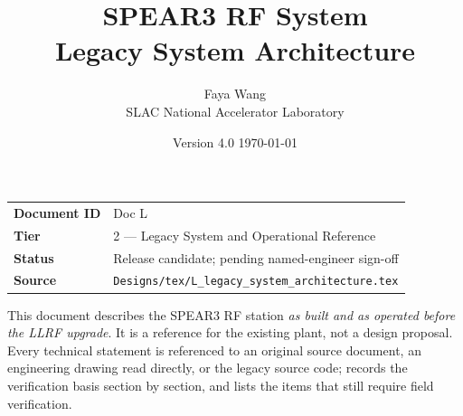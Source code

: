 \documentclass[letterpaper,11pt]{article}
\title{\vspace{-1.4cm}\bfseries SPEAR3 RF System\\[2mm]
       \Large Legacy System Architecture}
\author{Faya Wang\\[1mm]\normalsize SLAC National Accelerator Laboratory}
\date{Version 4.0 \quad\textbullet\quad \today}
\begin{document}
\maketitle
\thispagestyle{plain}

\begin{center}
\begin{minipage}{0.86\linewidth}\small
\begin{tabular}{@{}ll@{}}
\textbf{Document ID} & Doc L \\
\textbf{Tier}        & 2 --- Legacy System and Operational Reference \\
\textbf{Status}      & Release candidate; pending named-engineer sign-off \\
\textbf{Source}      & \texttt{Designs/tex/L\_legacy\_system\_architecture.tex} \\
\end{tabular}
\end{minipage}
\end{center}

\vspace{4mm}
\begin{keynote}
This document describes the SPEAR3 RF station \emph{as built and as operated
before the LLRF upgrade}.  It is a reference for the existing plant, not a
design proposal.  Every technical statement is referenced to an original source
document, an engineering drawing read directly, or the legacy source code;
 records the verification basis section by
section, and  lists the items that still require field
verification.
\end{keynote}

\clearpage
\tableofcontents
\clearpage
\listoffigures
\clearpage


\end{document}
